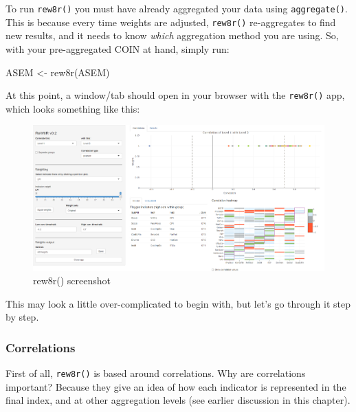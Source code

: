 \documentclass[
]{book}
\newenvironment{Shaded}{\begin{snugshade}}{\end{snugshade}}
\newcommand{\FunctionTok}[1]{\textcolor[rgb]{0.00,0.00,0.00}{#1}}
\newcommand{\NormalTok}[1]{#1}
\newcommand{\OtherTok}[1]{\textcolor[rgb]{0.56,0.35,0.01}{#1}}
\begin{document}
To run \texttt{rew8r()} you must have already aggregated your data using \texttt{aggregate()}. This is because every time weights are adjusted, \texttt{rew8r()} re-aggregates to find new results, and it needs to know \emph{which} aggregation method you are using. So, with your pre-aggregated COIN at hand, simply run:

\begin{Shaded}
\begin{Highlighting}[]
\NormalTok{ASEM }\OtherTok{\textless{}{-}} \FunctionTok{rew8r}\NormalTok{(ASEM)}
\end{Highlighting}
\end{Shaded}

At this point, a window/tab should open in your browser with the \texttt{rew8r()} app, which looks something like this:

\begin{figure}

{\centering \includegraphics[width=1\linewidth]{images/rew8r_screenshot} 

}

\caption{rew8r() screenshot}\label{fig:unnamed-chunk-69}
\end{figure}

This may look a little over-complicated to begin with, but let's go through it step by step.

\hypertarget{correlations-1}{%
\subsubsection{Correlations}\label{correlations-1}}

First of all, \texttt{rew8r()} is based around correlations. Why are correlations important? Because they give an idea of how each indicator is represented in the final index, and at other aggregation levels (see earlier discussion in this chapter).
\end{document}
